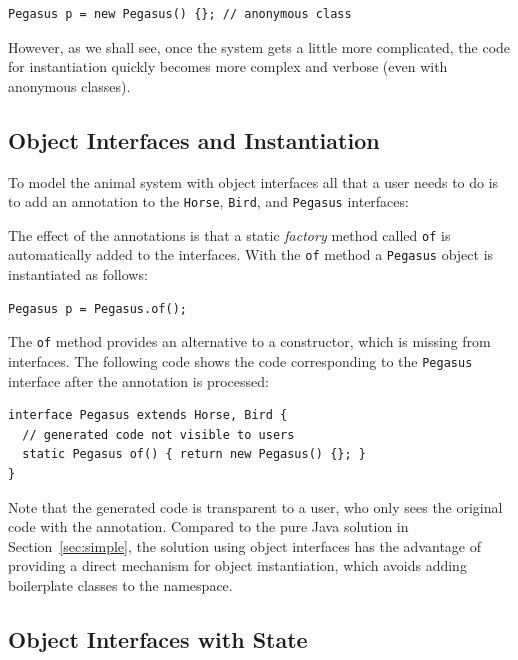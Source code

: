\begin{lstlisting}
Pegasus p = new Pegasus() {}; // anonymous class
\end{lstlisting}

\noindent However, as we shall see, once the system gets a little more
complicated, the code for instantiation quickly becomes more
complex and verbose (even with anonymous classes).

\subsection{Object Interfaces and Instantiation}

To model the animal system with object interfaces all that a user
needs to do is to add an \mixinAnn{} annotation to the \texttt{Horse},
\texttt{Bird}, and \texttt{Pegasus} interfaces:

\noindent The effect of the annotations is that a static \emph{factory} method called
\texttt{of} is automatically added to the interfaces. With the
\texttt{of} method a \texttt{Pegasus} object is instantiated as follows:

\begin{lstlisting}
Pegasus p = Pegasus.of();
\end{lstlisting}

\noindent The \texttt{of} method provides an alternative to a
constructor, which is missing from interfaces. The following code
shows the code corresponding to the \texttt{Pegasus} interface
after the \mixinAnn{} annotation is processed:

\begin{lstlisting}
interface Pegasus extends Horse, Bird {
  // generated code not visible to users
  static Pegasus of() { return new Pegasus() {}; }
}
\end{lstlisting}

\noindent Note that the generated code is transparent to a user, who
only sees the original code with the \mixin annotation. Compared to the pure
Java solution in Section~\ref{sec:simple}, the solution using object interfaces
has the advantage of providing a direct mechanism for object
instantiation, which avoids adding boilerplate classes to the
namespace.

\subsection{Object Interfaces with State}

